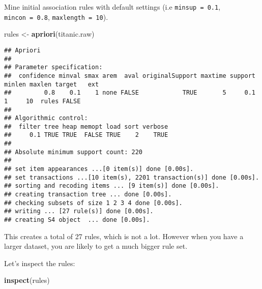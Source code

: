 \documentclass[]{article}
\newenvironment{Shaded}{\begin{snugshade}}{\end{snugshade}}
\newcommand{\KeywordTok}[1]{\textcolor[rgb]{0.13,0.29,0.53}{\textbf{#1}}}
\newcommand{\NormalTok}[1]{#1}
\newcommand{\StringTok}[1]{\textcolor[rgb]{0.31,0.60,0.02}{#1}}
\begin{document}
Mine initial association rules with default settings (i.e
\texttt{minsup\ =\ 0.1}, \texttt{mincon\ =\ 0.8},
\texttt{maxlength\ =\ 10}).

\begin{Shaded}
\begin{Highlighting}[]
\NormalTok{rules <-}\StringTok{ }\KeywordTok{apriori}\NormalTok{(titanic.raw)}
\end{Highlighting}
\end{Shaded}

\begin{verbatim}
## Apriori
## 
## Parameter specification:
##  confidence minval smax arem  aval originalSupport maxtime support minlen maxlen target   ext
##         0.8    0.1    1 none FALSE            TRUE       5     0.1      1     10  rules FALSE
## 
## Algorithmic control:
##  filter tree heap memopt load sort verbose
##     0.1 TRUE TRUE  FALSE TRUE    2    TRUE
## 
## Absolute minimum support count: 220 
## 
## set item appearances ...[0 item(s)] done [0.00s].
## set transactions ...[10 item(s), 2201 transaction(s)] done [0.00s].
## sorting and recoding items ... [9 item(s)] done [0.00s].
## creating transaction tree ... done [0.00s].
## checking subsets of size 1 2 3 4 done [0.00s].
## writing ... [27 rule(s)] done [0.00s].
## creating S4 object  ... done [0.00s].
\end{verbatim}

This creates a total of 27 rules, which is not a lot. However when you
have a larger dataset, you are likely to get a much bigger rule set.

Let's inspect the rules:

\begin{Shaded}
\begin{Highlighting}[]
\KeywordTok{inspect}\NormalTok{(rules)}
\end{Highlighting}
\end{Shaded}
\end{document}
